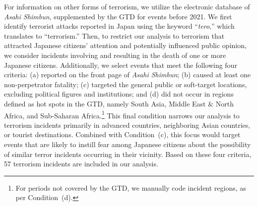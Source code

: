 \documentclass[letterpaper,12pt]{scrartcl}
\begin{document}
For information on other forms of terrorism, we utilize the electronic database of \emph{Asahi Shimbun}, supplemented by the GTD for events before 2021. We first identify terrorist attacks reported in Japan using the keyword ``\emph{tero},'' which translates to ``terrorism.'' Then, to restrict our analysis to terrorism that attracted Japanese citizens' attention and potentially influenced public opinion, we consider incidents involving and resulting in the death of one or more Japanese citizens. Additionally, we select events that meet the following four criteria: (a) reported on the front page of \emph{Asahi Shimbun}; (b) caused at least one non-perpetrator fatality; (c) targeted the general public or soft-target locations, excluding political figures and institutions; and (d) did not occur in regions defined as hot spots in the GTD, namely South Asia, Middle East \& North Africa, and Sub-Saharan Africa.\footnote{For periods not covered by the GTD, we manually code incident regions, as per Condition~(d).} This final condition narrows our analysis to terrorism incidents primarily in advanced countries, neighboring Asian countries, or tourist destinations. Combined with Condition~(c), this focus would target events that are likely to instill fear among Japanese citizens about the possibility of similar terror incidents occurring in their vicinity. Based on these four criteria, 57 terrorism incidents are included in our analysis.
\end{document}
